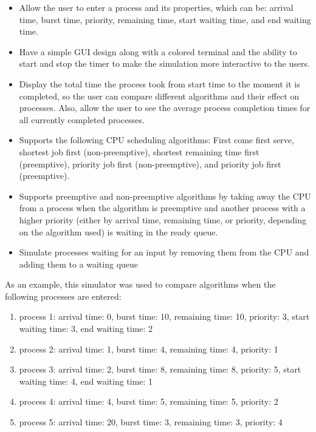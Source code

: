 \documentclass{article}
\begin{document}
\begin{itemize}
    \item Allow the user to enter a process and its properties, which can be: arrival time, burst time, priority, remaining time, start waiting time, and end waiting time.
    \item Have a simple GUI design along with a colored terminal and the ability to start and stop the timer to make the simulation more interactive to the users.
    \item Display the total time the process took from start time to the moment it is completed, so the user can compare different algorithms and their effect on processes. Also, allow the user to see the average process completion times for all currently completed processes.
    \item Supports the following CPU scheduling algorithms: First come first serve, shortest job first (non-preemptive), shortest remaining time first (preemptive), priority job first (non-preemptive), and priority job first (preemptive).
    \item Supports preemptive and non-preemptive algorithms by taking away the CPU from a process when the algorithm is preemptive and another process with a higher priority (either by arrival time, remaining time, or priority, depending on the algorithm used) is waiting in the ready queue. 
    \item Simulate processes waiting for an input by removing them from the CPU and adding them to a waiting queue
\end{itemize}

As an example, this simulator was used to compare algorithms when the following processes are entered:

\begin{enumerate}
    \item process 1: arrival time: 0, burst time: 10, remaining time: 10, priority: 3, start waiting time: 3, end waiting time: 2
    \item process 2: arrival time: 1, burst time: 4, remaining time: 4, priority: 1
    \item process 3: arrival time: 2, burst time: 8, remaining time: 8, priority: 5, start waiting time: 4, end waiting time: 1 
    \item process 4: arrival time: 4, burst time: 5, remaining time: 5, priority: 2
    \item process 5: arrival time: 20, burst time: 3, remaining time: 3, priority: 4
\end{enumerate}
\end{document}
